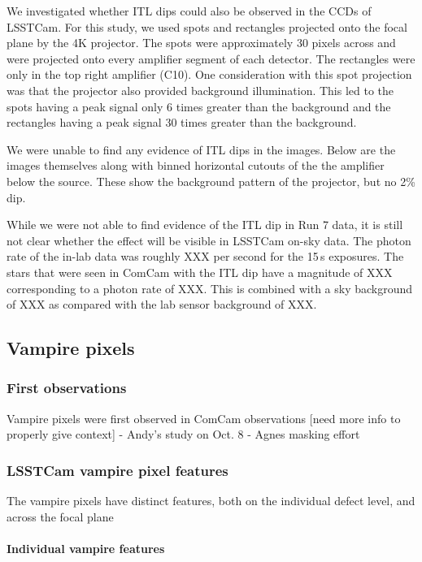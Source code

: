 We investigated whether ITL dips could also be observed in the CCDs of
LSSTCam. For this study, we used spots and rectangles projected onto the focal plane by the 4K
projector. The spots were approximately 30 pixels across
and were projected onto every amplifier segment of each detector. The rectangles were only
in the top right amplifier (C10). One consideration with this spot
projection was that the projector also provided background illumination. This led to the spots having a peak signal only 6 times greater
than the background and the rectangles having a peak signal 30 times greater
than the background.

We were unable to find any evidence of ITL
dips in the images. Below are the images themselves along with binned horizontal
cutouts of the the amplifier below the source. These show the background
pattern of the projector, but no 2\% dip.

While we were not able to find evidence of the ITL dip in Run 7 data, it
is still not clear whether the effect will be visible in LSSTCam on-sky data.
The photon rate of the in-lab data was roughly XXX per second for the 15\,s exposures. The stars that were seen in ComCam with the ITL dip
have a magnitude of XXX corresponding to a photon rate of XXX. This is
combined with a sky background of XXX as compared with the lab sensor
background of XXX.

\subsection{Vampire pixels}\label{vampire-pixels}

\subsubsection{First observations}\label{first-observations}

Vampire pixels were first observed in ComCam observations {[}need more
info to properly give context{]} - Andy's study on Oct.
8 - Agnes masking effort

\subsubsection{LSSTCam vampire pixel
features}\label{lsstcam-vampire-pixel-features}

The vampire pixels have distinct features, both on the individual defect
level, and across the focal plane

\paragraph{Individual vampire
features}\label{individual-vampire-features}

